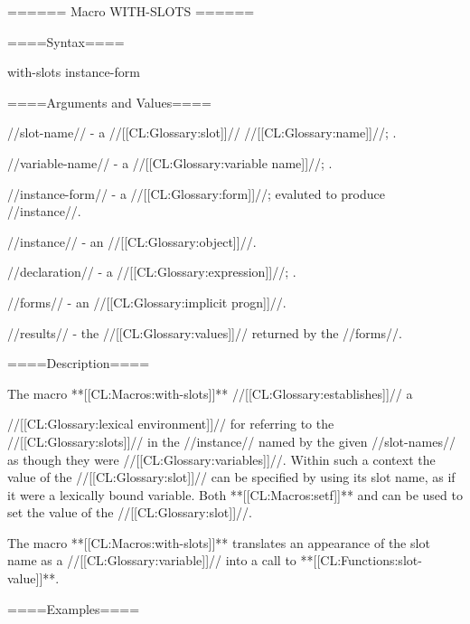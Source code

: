 ====== Macro WITH-SLOTS ======


====Syntax====

\DefmacWithValuesNewline with-slots { instance-form  } {}


====Arguments and Values====

//slot-name// - a //[[CL:Glossary:slot]]// //[[CL:Glossary:name]]//; \noeval.

//variable-name// - a //[[CL:Glossary:variable name]]//; \noeval.

//instance-form// - a //[[CL:Glossary:form]]//; evaluted to produce //instance//.

//instance// - an //[[CL:Glossary:object]]//.

//declaration// - a  //[[CL:Glossary:expression]]//; \noeval.

//forms// - an //[[CL:Glossary:implicit progn]]//.

//results// - the //[[CL:Glossary:values]]// returned by the //forms//.

====Description====

The macro **[[CL:Macros:with-slots]]** //[[CL:Glossary:establishes]]// a

//[[CL:Glossary:lexical environment]]// for referring to the //[[CL:Glossary:slots]]// in the //instance// named by the given //slot-names// as though they were //[[CL:Glossary:variables]]//. Within such a context the value of the //[[CL:Glossary:slot]]// can be specified by using its slot name, as if it were a lexically bound variable. Both **[[CL:Macros:setf]]** and  can be used to set the value of the //[[CL:Glossary:slot]]//.

The macro **[[CL:Macros:with-slots]]** translates an appearance of the slot name as a //[[CL:Glossary:variable]]// into a call to **[[CL:Functions:slot-value]]**.

====Examples====

